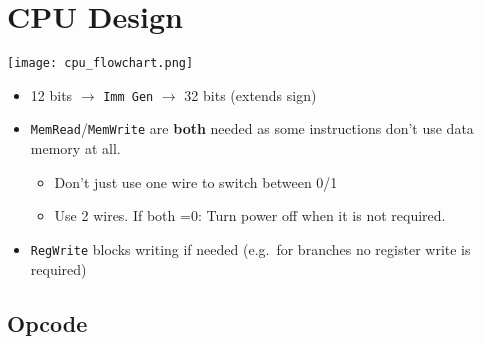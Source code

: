 \section{CPU Design}\label{cpu design}

\begin{center}
    \texttt{[image: cpu\_flowchart.png]}
\end{center}

\newpar{}
\begin{itemize}
    \item 12 bits $\to$ \texttt{Imm Gen} $\to$ 32 bits (extends sign)
    \item \texttt{MemRead}/\texttt{MemWrite} are \textbf{both} needed as some instructions don't use data memory at all.
    \begin{itemize}
        \item Don't just use one wire to switch between 0/1
        \item Use 2 wires. If both =0: Turn power off when it is not required.
    \end{itemize}
    \item \texttt{RegWrite} blocks writing if needed (e.g.\ for branches no register write is required)
\end{itemize}

\subsection{Opcode}

